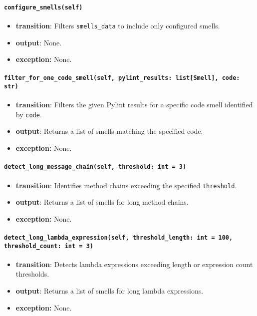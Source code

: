 \documentclass[12pt, titlepage]{article}
\begin{document}
\paragraph{\texttt{configure\_smells(self)}}
\begin{itemize}
  \item \textbf{transition}: Filters \texttt{smells\_data} to include only configured smells.
  \item \textbf{output}: None.
  \item \textbf{exception:} None.
\end{itemize}

\paragraph{\texttt{filter\_for\_one\_code\_smell(self, pylint\_results: list[Smell], code: str)}}
\begin{itemize}
  \item \textbf{transition}: Filters the given Pylint results for a specific code smell identified by \texttt{code}.
  \item \textbf{output}: Returns a list of smells matching the specified code.
  \item \textbf{exception:} None.
\end{itemize}

\paragraph{\texttt{detect\_long\_message\_chain(self, threshold: int = 3)}}
\begin{itemize}
  \item \textbf{transition}: Identifies method chains exceeding the specified \texttt{threshold}.
  \item \textbf{output}: Returns a list of smells for long method chains.
  \item \textbf{exception:} None.
\end{itemize}

\paragraph{\texttt{detect\_long\_lambda\_expression(self, threshold\_length: int = 100, threshold\_count: int = 3)}}
\begin{itemize}
  \item \textbf{transition}: Detects lambda expressions exceeding length or expression count thresholds.
  \item \textbf{output}: Returns a list of smells for long lambda expressions.
  \item \textbf{exception:} None.
\end{itemize}
\end{document}
